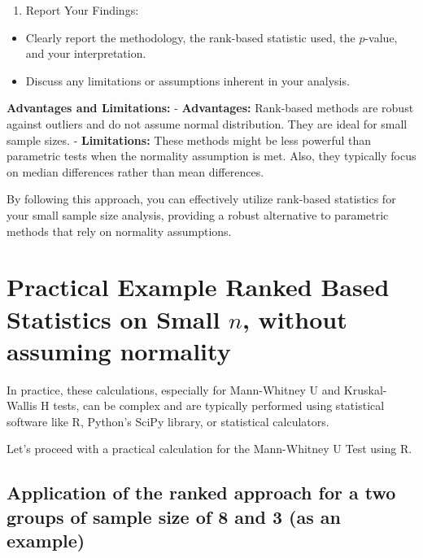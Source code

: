 \documentclass[
  12pt,
  a4paper,
]{article}
\providecommand{\tightlist}{%
  \setlength{\itemsep}{0pt}\setlength{\parskip}{0pt}}
\numberwithin{equation}{section}
\theoremstyle{plain}
\theoremstyle{definition}
\theoremstyle{remark}
\theoremstyle{note}
\begin{document}
\begin{enumerate}
\def\labelenumi{\arabic{enumi}.}
\setcounter{enumi}{5}
\tightlist
\item
  Report Your Findings:
\end{enumerate}

\begin{itemize}
\tightlist
\item
  Clearly report the methodology, the rank-based statistic used, the
  \(p\)-value, and your interpretation.
\item
  Discuss any limitations or assumptions inherent in your analysis.
\end{itemize}

\textbf{Advantages and Limitations:} - \textbf{Advantages:} Rank-based
methods are robust against outliers and do not assume normal
distribution. They are ideal for small sample sizes. -
\textbf{Limitations:} These methods might be less powerful than
parametric tests when the normality assumption is met. Also, they
typically focus on median differences rather than mean differences.

By following this approach, you can effectively utilize rank-based
statistics for your small sample size analysis, providing a robust
alternative to parametric methods that rely on normality assumptions.

\hypertarget{practical-example-ranked-based-statistics-on-small-n-without-assuming-normality}{%
\section{\texorpdfstring{Practical Example Ranked Based Statistics on
Small \(n\), without assuming
normality}{Practical Example Ranked Based Statistics on Small n, without assuming normality}}\label{practical-example-ranked-based-statistics-on-small-n-without-assuming-normality}}

In practice, these calculations, especially for Mann-Whitney U and
Kruskal-Wallis H tests, can be complex and are typically performed using
statistical software like R, Python's SciPy library, or statistical
calculators.

Let's proceed with a practical calculation for the Mann-Whitney U Test
using R.

\hypertarget{application-of-the-ranked-approach-for-a-two-groups-of-sample-size-of-8-and-3-as-an-example}{%
\subsection{Application of the ranked approach for a two groups of
sample size of 8 and 3 (as an
example)}\label{application-of-the-ranked-approach-for-a-two-groups-of-sample-size-of-8-and-3-as-an-example}}
\end{document}
